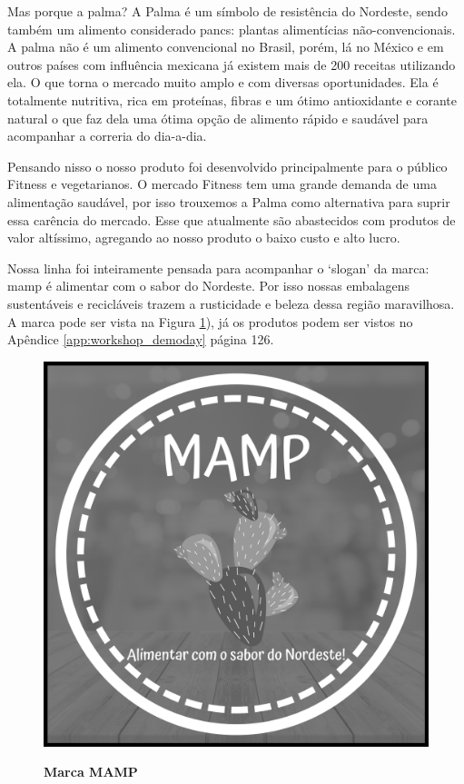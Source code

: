 Mas porque a palma? A Palma é um símbolo de resistência do Nordeste, sendo também um alimento considerado pancs: plantas alimentícias não-convencionais. A palma não é um alimento convencional no Brasil, porém, lá no México e em outros países com influência mexicana já existem mais de 200 receitas utilizando ela. O que torna o mercado muito amplo e com diversas oportunidades. Ela é totalmente nutritiva, rica em proteínas, fibras e um ótimo antioxidante e corante natural o que faz dela uma ótima opção de alimento rápido e saudável para acompanhar a correria do dia-a-dia.

Pensando nisso o nosso produto foi desenvolvido principalmente para o público Fitness e vegetarianos. O mercado Fitness tem uma grande demanda de uma alimentação saudável, por isso trouxemos a Palma como alternativa para suprir essa carência do mercado. Esse que atualmente são abastecidos com produtos de valor altíssimo, agregando ao nosso produto o baixo custo e alto lucro.

Nossa linha foi inteiramente pensada para acompanhar o ‘slogan’ da marca: mamp é alimentar com o sabor do Nordeste. Por isso nossas embalagens sustentáveis e recicláveis trazem a rusticidade e beleza dessa região maravilhosa. A marca pode ser vista na Figura \ref{figura_22}), já os produtos podem ser vistos no Apêndice \ref{app:workshop_demoday} página 126.


\begin{figure}[H]
\centering
\caption{\textbf{Marca MAMP}}
\includegraphics[scale=0.08]{Imagens/mamp.png}
\label{figura_22}
\end{figure}



